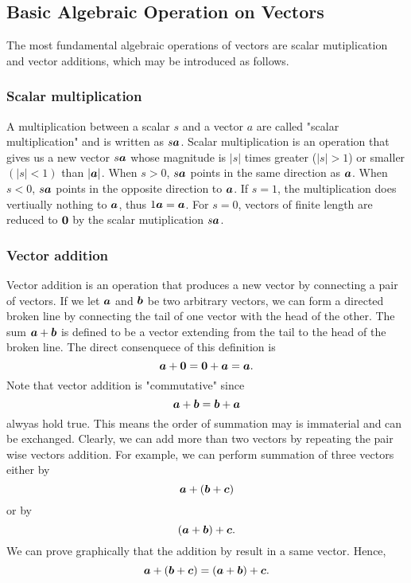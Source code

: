 \documentclass[10pt,a4j]{jarticle}
\begin{document}
\subsection{Basic Algebraic Operation on Vectors}
The most fundamental algebraic operations of vectors are scalar mutiplication 
and vector additions, which may be introduced as follows.
\subsubsection{Scalar multiplication}
A multiplication between a scalar $s$ and a vector $a$ are called 
"scalar multiplication" and is written as $s\mbox{\boldmath $a$}$. 
Scalar multiplication is an operation that gives us a new vector $s\mbox{\boldmath $a$}$ 
whose magnitude is $|s|$ times greater ($|s|>1$) or smaller $(|s|<1)$ than 
$|\mbox{\boldmath $a$}|$.
When $s>0$, $s\mbox{\boldmath $a$}$ points in the same direction as $\mbox{\boldmath $a$}$. 
When $s<0$, $s\mbox{\boldmath $a$}$ points in the opposite direction to $\mbox{\boldmath $a$}$. 
If $s=1$, the multiplication does vertiually nothing to $\mbox{\boldmath $a$}$, thus 
$1\mbox{\boldmath $a$}=\mbox{\boldmath $a$}$. For $s=0$, vectors of finite length are reduced to $\mbox{\boldmath $0$}$ by the 
scalar mutiplication $s\mbox{\boldmath $a$}$.
\subsubsection{Vector addition}
Vector addition is an operation that produces a new vector by connecting a pair of vectors. 
If we let $\mbox{\boldmath $a$}$ and $\mbox{\boldmath $b$}$ be two arbitrary vectors, 
we can form a directed broken line by connecting the tail of one vector with 
the head of the other. The sum $\mbox{\boldmath $a$}+\mbox{\boldmath $b$}$ is defined to be a vector 
extending from the tail to the head of the broken line.
The direct consenquece of this definition is 
\begin{equation}
	\mbox{\boldmath $a$}+\mbox{\boldmath $0$} = \mbox{\boldmath $0$}+\mbox{\boldmath $a$}=\mbox{\boldmath $a$}. 
\end{equation}
Note that vector addition is "commutative" since 
\[
	\mbox{\boldmath $a$}+\mbox{\boldmath $b$}=\mbox{\boldmath $b$}+\mbox{\boldmath $a$}
\]
alwyas hold true. This means the order of summation may is immaterial and can be 
exchanged. Clearly, we can add more than two vectors by repeating the pair wise vectors addition.
For example, we can perform summation of three vectors either by 
\[
	\mbox{\boldmath $a$}+\left( \mbox{\boldmath $b$}+\mbox{\boldmath $c$} \right)
\]
or by 
\[
	\left( \mbox{\boldmath $a$}+\mbox{\boldmath $b$} \right) + \mbox{\boldmath $c$}.
\]
We can prove graphically that the addition by result in a same vector. Hence, 
\begin{equation}
	\mbox{\boldmath $a$}+\left( \mbox{\boldmath $b$}+\mbox{\boldmath $c$} \right)
	=
	\left( \mbox{\boldmath $a$}+\mbox{\boldmath $b$} \right) + \mbox{\boldmath $c$}.
\end{equation}
\end{document}
